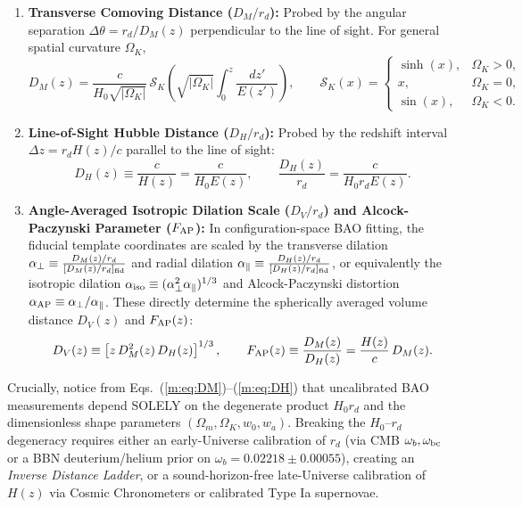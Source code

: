 \documentclass[aps,prd,preprint,superscriptaddress,nofootinbib]{revtex4-2}
\begin{document}
\begin{enumerate}
    \setlength{\itemsep}{3pt}
    \item \textbf{Transverse Comoving Distance ($D_M/r_d$):} Probed by the angular separation $\Delta\theta = r_d / D_M(z)$ perpendicular to the line of sight. For general spatial curvature $\Omega_K$,
    \begin{equation}
        D_M(z) = \frac{c}{H_0 \sqrt{|\Omega_K|}}\, \mathcal{S}_K\!\left( \sqrt{|\Omega_K|} \int_0^z \frac{dz'}{E(z')} \right), \qquad \mathcal{S}_K(x) = \begin{cases} \sinh(x), & \Omega_K > 0, \\ x, & \Omega_K = 0, \\ \sin(x), & \Omega_K < 0. \end{cases}
        \label{m:eq:DM}
    \end{equation}
    \item \textbf{Line-of-Sight Hubble Distance ($D_H/r_d$):} Probed by the redshift interval $\Delta z = r_d H(z)/c$ parallel to the line of sight:
    \begin{equation}
        D_H(z) \equiv \frac{c}{H(z)} = \frac{c}{H_0 E(z)}, \qquad \frac{D_H(z)}{r_d} = \frac{c}{H_0 r_d E(z)}.
        \label{m:eq:DH}
    \end{equation}
    \item \textbf{Angle-Averaged Isotropic Dilation Scale ($D_V/r_d$) and Alcock-Paczynski Parameter ($F_{\rm AP}$):} In configuration-space BAO fitting, the fiducial template coordinates are scaled by the transverse dilation $\alpha_\perp \equiv \frac{D_M(z)/r_d}{[D_M(z)/r_d]_{\rm fid}}$ and radial dilation $\alpha_\parallel \equiv \frac{D_H(z)/r_d}{[D_H(z)/r_d]_{\rm fid}}$, or equivalently the isotropic dilation $\alpha_{\rm iso} \equiv (\alpha_\perp^2 \alpha_\parallel)^{1/3}$ and Alcock-Paczynski distortion $\alpha_{\rm AP} \equiv \alpha_\perp / \alpha_\parallel$. These directly determine the spherically averaged volume distance $D_V(z)$ and $F_{\rm AP}(z)$:
    \begin{equation}
        D_V(z) \equiv \left[ z\, D_M^2(z)\, D_H(z) \right]^{1/3}, \qquad F_{\rm AP}(z) \equiv \frac{D_M(z)}{D_H(z)} = \frac{H(z)}{c}\, D_M(z).
        \label{m:eq:DV_FAP}
    \end{equation}
\end{enumerate}

Crucially, notice from Eqs.~(\ref{m:eq:DM})--(\ref{m:eq:DH}) that uncalibrated BAO measurements depend SOLELY on the degenerate product $H_0 r_d$ and the dimensionless shape parameters $(\Omega_m, \Omega_K, w_0, w_a)$. Breaking the $H_0$--$r_d$ degeneracy requires either an early-Universe calibration of $r_d$ (via CMB $\omega_b, \omega_{\rm bc}$ or a BBN deuterium/helium prior on $\omega_b = 0.02218 \pm 0.00055$), creating an \emph{Inverse Distance Ladder}, or a sound-horizon-free late-Universe calibration of $H(z)$ via Cosmic Chronometers or calibrated Type Ia supernovae.
\end{document}
